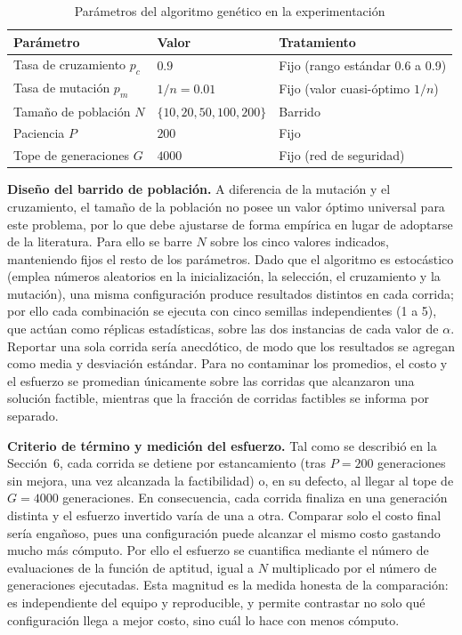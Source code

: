 \documentclass[letter, 10pt]{article}
\begin{document}
\begin{table}[h]
\centering
\caption{Parámetros del algoritmo genético en la experimentación}
\label{tab:hiperparametros}
\begin{tabular}{lll}
\hline
\textbf{Parámetro} & \textbf{Valor} & \textbf{Tratamiento} \\
\hline
Tasa de cruzamiento $p_c$ & $0.9$ & Fijo (rango estándar 0.6 a 0.9) \\
Tasa de mutación $p_m$ & $1/n = 0.01$ & Fijo (valor cuasi-óptimo $1/n$) \\
Tamaño de población $N$ & $\{10, 20, 50, 100, 200\}$ & Barrido \\
Paciencia $P$ & $200$ & Fijo \\
Tope de generaciones $G$ & $4000$ & Fijo (red de seguridad) \\
\hline
\end{tabular}
\end{table}

\textbf{Diseño del barrido de población.} A diferencia de la mutación y el cruzamiento, el tamaño
de la población no posee un valor óptimo universal para este problema, por lo que debe ajustarse de
forma empírica en lugar de adoptarse de la literatura. Para ello se barre $N$ sobre los cinco
valores indicados, manteniendo fijos el resto de los parámetros. Dado que el algoritmo es
estocástico (emplea números aleatorios en la inicialización, la selección, el cruzamiento y la
mutación), una misma configuración produce resultados distintos en cada corrida; por ello cada
combinación se ejecuta con cinco semillas independientes (1 a 5), que actúan como réplicas
estadísticas, sobre las dos instancias de cada valor de $\alpha$. Reportar una sola corrida sería
anecdótico, de modo que los resultados se agregan como media y desviación estándar. Para no
contaminar los promedios, el costo y el esfuerzo se promedian únicamente sobre las corridas que
alcanzaron una solución factible, mientras que la fracción de corridas factibles se informa por
separado.

\textbf{Criterio de término y medición del esfuerzo.} Tal como se describió en la Sección~6, cada
corrida se detiene por estancamiento (tras $P = 200$ generaciones sin mejora, una vez alcanzada la
factibilidad) o, en su defecto, al llegar al tope de $G = 4000$ generaciones. En consecuencia, cada
corrida finaliza en una generación distinta y el esfuerzo invertido varía de una a otra. Comparar
solo el costo final sería engañoso, pues una configuración puede alcanzar el mismo costo gastando
mucho más cómputo. Por ello el esfuerzo se cuantifica mediante el número de evaluaciones de la
función de aptitud, igual a $N$ multiplicado por el número de generaciones ejecutadas. Esta
magnitud es la medida honesta de la comparación: es independiente del equipo y reproducible, y
permite contrastar no solo qué configuración llega a mejor costo, sino cuál lo hace con menos
cómputo.
\end{document}

